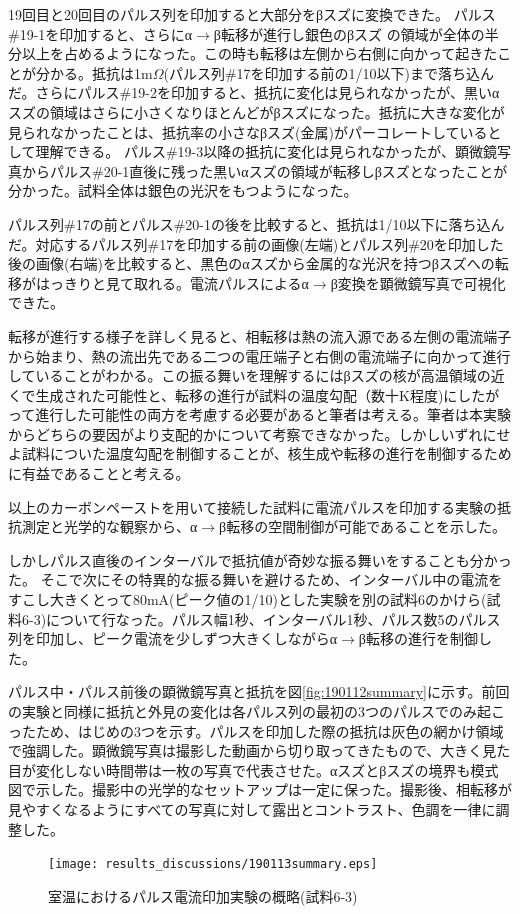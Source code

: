 19回目と20回目のパルス列を印加すると大部分をβスズに変換できた。
パルス\#19-1を印加すると、さらにα$\to$β転移が進行し銀色のβスズ
の領域が全体の半分以上を占めるようになった。この時も転移は左側から右側に向かって起きたことが分かる。抵抗は1m$\Omega$(パルス列\#17を印加する前の1/10以下)まで落ち込んだ。さらにパルス\#19-2を印加すると、抵抗に変化は見られなかったが、黒いαスズの領域はさらに小さくなりほとんどがβスズになった。抵抗に大きな変化が見られなかったことは、抵抗率の小さなβスズ(金属)がパーコレートしているとして理解できる。
パルス\#19-3以降の抵抗に変化は見られなかったが、顕微鏡写真からパルス\#20-1直後に残った黒いαスズの領域が転移しβスズとなったことが分かった。試料全体は銀色の光沢をもつようになった。

パルス列\#17の前とパルス\#20-1の後を比較すると、抵抗は1/10以下に落ち込んだ。対応するパルス列\#17を印加する前の画像(左端)とパルス列\#20を印加した後の画像(右端)を比較すると、黒色のαスズから金属的な光沢を持つβスズへの転移がはっきりと見て取れる。電流パルスによるα$\to$β変換を顕微鏡写真で可視化できた。

転移が進行する様子を詳しく見ると、相転移は熱の流入源である左側の電流端子から始まり、熱の流出先である二つの電圧端子と右側の電流端子に向かって進行していることがわかる。この振る舞いを理解するにはβスズの核が高温領域の近くで生成された可能性と、転移の進行が試料の温度勾配（数十K程度)にしたがって進行した可能性の両方を考慮する必要があると筆者は考える。筆者は本実験からどちらの要因がより支配的かについて考察できなかった。しかしいずれにせよ試料についた温度勾配を制御することが、核生成や転移の進行を制御するために有益であることと考える。

以上のカーボンペーストを用いて接続した試料に電流パルスを印加する実験の抵抗測定と光学的な観察から、α$\to$β転移の空間制御が可能であることを示した。

しかしパルス直後のインターバルで抵抗値が奇妙な振る舞いをすることも分かった。
そこで次にその特異的な振る舞いを避けるため、インターバル中の電流をすこし大きくとって80mA(ピーク値の1/10)とした実験を別の試料6のかけら(試料6-3)について行なった。パルス幅1秒、インターバル1秒、パルス数5のパルス列を印加し、ピーク電流を少しずつ大きくしながらα$\to$β転移の進行を制御した。

パルス中・パルス前後の顕微鏡写真と抵抗を図\ref{fig:190112summary}に示す。前回の実験と同様に抵抗と外見の変化は各パルス列の最初の3つのパルスでのみ起こったため、はじめの3つを示す。パルスを印加した際の抵抗は灰色の網かけ領域で強調した。顕微鏡写真は撮影した動画から切り取ってきたもので、大きく見た目が変化しない時間帯は一枚の写真で代表させた。αスズとβスズの境界も模式図で示した。撮影中の光学的なセットアップは一定に保った。撮影後、相転移が見やすくなるようにすべての写真に対して露出とコントラスト、色調を一律に調整した。
\begin{landscape}
\begin{figure}[!h]
    \begin{center}
   \texttt{[image: results\_discussions/190113summary.eps]}
  \end{center}
    \caption{室温におけるパルス電流印加実験の概略(試料6-3)}
  \label{fig:190113summary}
\end{figure}
\end{landscape}

